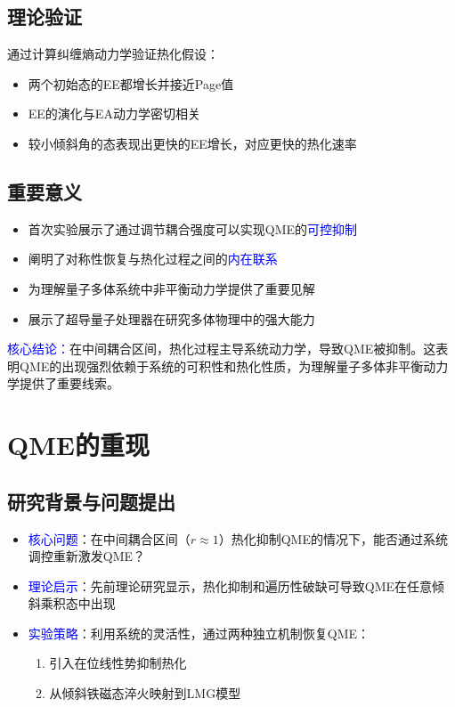 \documentclass[11pt,a4paper]{article}
\begin{document}
\subsection{理论验证}
通过计算纠缠熵动力学验证热化假设：
\begin{itemize}
    \item 两个初始态的EE都增长并接近Page值
    \item EE的演化与EA动力学密切相关
    \item 较小倾斜角的态表现出更快的EE增长，对应更快的热化速率
\end{itemize}

\subsection{重要意义}
\begin{itemize}
    \item 首次实验展示了通过调节耦合强度可以实现QME的\textcolor{blue}{可控抑制}
    \item 阐明了对称性恢复与热化过程之间的\textcolor{blue}{内在联系}
    \item 为理解量子多体系统中非平衡动力学提供了重要见解
    \item 展示了超导量子处理器在研究多体物理中的强大能力
\end{itemize}

\textcolor{blue}{核心结论：}在中间耦合区间，热化过程主导系统动力学，导致QME被抑制。这表明QME的出现强烈依赖于系统的可积性和热化性质，为理解量子多体非平衡动力学提供了重要线索。


\section{QME的重现}

\subsection{研究背景与问题提出}
\begin{itemize}
    \item \textcolor{blue}{核心问题}：在中间耦合区间（$r \approx 1$）热化抑制QME的情况下，能否通过系统调控重新激发QME？
    \item \textcolor{blue}{理论启示}：先前理论研究显示，热化抑制和遍历性破缺可导致QME在任意倾斜乘积态中出现
    \item \textcolor{blue}{实验策略}：利用系统的灵活性，通过两种独立机制恢复QME：
    \begin{enumerate}
        \item 引入在位线性势抑制热化
        \item 从倾斜铁磁态淬火映射到LMG模型
    \end{enumerate}
\end{itemize}
\end{document}
